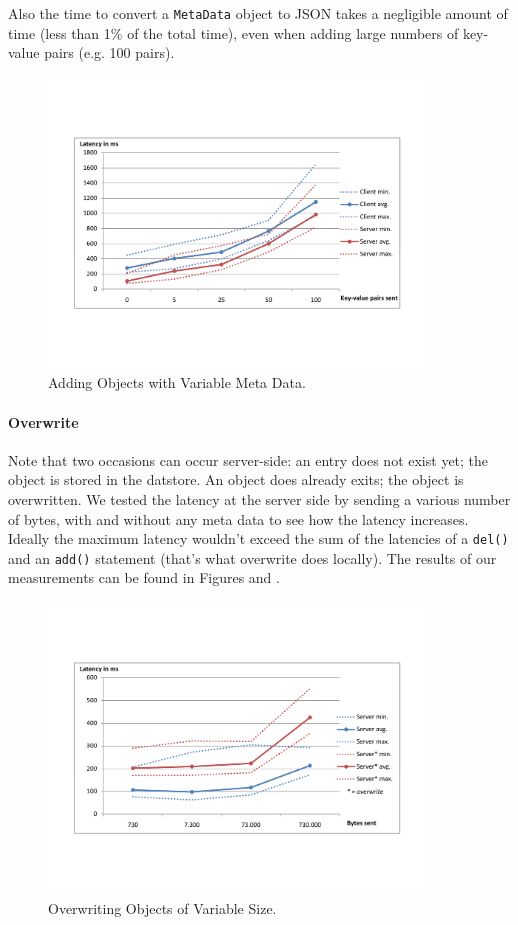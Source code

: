 Also the time to convert a \texttt{MetaData} object to JSON takes a negligible
amount of time (less than 1\% of the total time), even when adding large numbers
of key-value pairs (e.g. 100 pairs).

\begin{figure} %
\begin{center}
\includegraphics[trim=5cm 4cm 5cm 5cm,width=10cm]{./figures/add_md.pdf}
\caption{Adding Objects with Variable Meta Data. \label{add-md-size}}
\end{center}
\end{figure}

\paragraph{Overwrite}
Note that two occasions can occur server-side: an entry does not exist yet; the
object is stored in the datstore. An object does already exits; the object is
overwritten. We tested the latency at the server side by sending a various
number of bytes, with and without any meta data to see how the latency
increases. Ideally the maximum latency wouldn't exceed the sum of the latencies
of a \texttt{del()} and an \texttt{add()} statement (that's what overwrite
does locally). The results of our measurements can be found in Figures
\label{ovw-obj-size} and \label{ovw-md-size}.

\begin{figure} %
\begin{center}
\includegraphics[trim=5cm 4cm 5cm 5cm,width=10cm]{./figures/ovw_obj.pdf}
\caption{Overwriting Objects of Variable Size. \label{ovw-obj-size}}
\end{center}
\end{figure}

